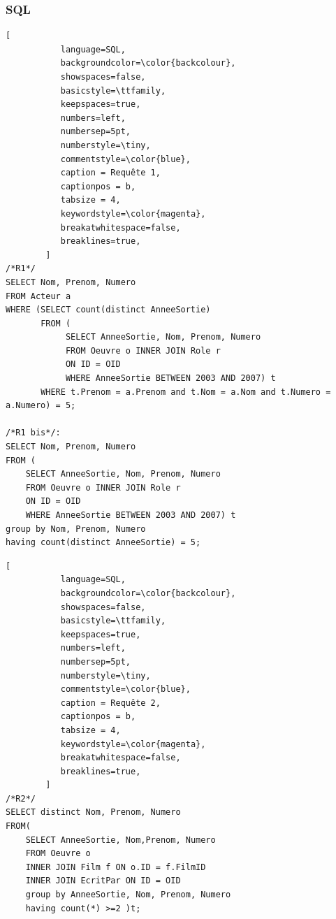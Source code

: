 \documentclass[10pt,a4paper]{article}
\begin{document}
\subsubsection{SQL}
\begin{lstlisting}[
           language=SQL,
           backgroundcolor=\color{backcolour},
           showspaces=false,
           basicstyle=\ttfamily,
           keepspaces=true,                 
           numbers=left,                    
           numbersep=5pt,
           numberstyle=\tiny,
           commentstyle=\color{blue},
           caption = Requête 1,
           captionpos = b, 
           tabsize = 4,
           keywordstyle=\color{magenta},
           breakatwhitespace=false,         
           breaklines=true,
        ]
/*R1*/
SELECT Nom, Prenom, Numero
FROM Acteur a
WHERE (SELECT count(distinct AnneeSortie)
	   FROM (
			SELECT AnneeSortie, Nom, Prenom, Numero
			FROM Oeuvre o INNER JOIN Role r
			ON ID = OID
			WHERE AnneeSortie BETWEEN 2003 AND 2007) t
	   WHERE t.Prenom = a.Prenom and t.Nom = a.Nom and t.Numero = a.Numero) = 5;
       
/*R1 bis*/:
SELECT Nom, Prenom, Numero
FROM (
	SELECT AnneeSortie, Nom, Prenom, Numero
	FROM Oeuvre o INNER JOIN Role r
	ON ID = OID
	WHERE AnneeSortie BETWEEN 2003 AND 2007) t
group by Nom, Prenom, Numero
having count(distinct AnneeSortie) = 5;
\end{lstlisting}
\newpage
\begin{lstlisting}[
           language=SQL,
           backgroundcolor=\color{backcolour},
           showspaces=false,
           basicstyle=\ttfamily,
           keepspaces=true,                 
           numbers=left,                    
           numbersep=5pt,
           numberstyle=\tiny,
           commentstyle=\color{blue},
           caption = Requête 2,
           captionpos = b,
           tabsize = 4,
           keywordstyle=\color{magenta},
           breakatwhitespace=false,         
           breaklines=true,
        ]
/*R2*/
SELECT distinct Nom, Prenom, Numero
FROM(
	SELECT AnneeSortie, Nom,Prenom, Numero
	FROM Oeuvre o
	INNER JOIN Film f ON o.ID = f.FilmID
	INNER JOIN EcritPar ON ID = OID
	group by AnneeSortie, Nom, Prenom, Numero
	having count(*) >=2 )t;
\end{lstlisting}
\end{document}
